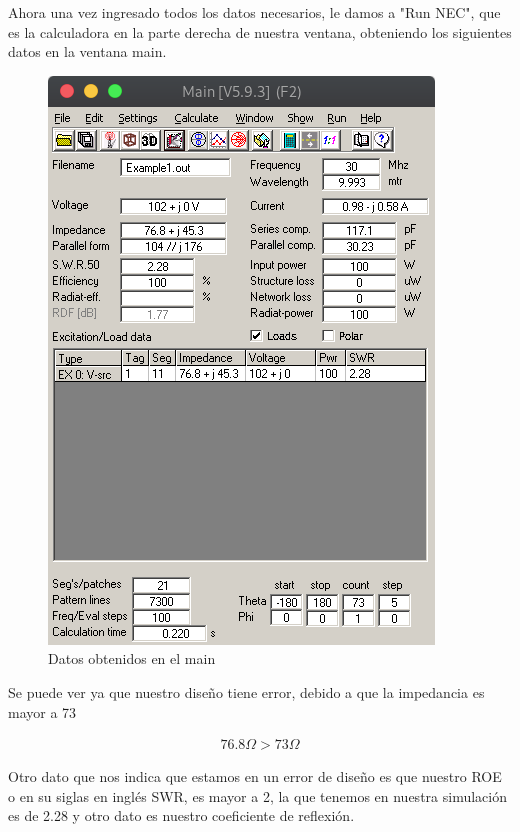 \documentclass[11pt,a4paper]{article}
\begin{document}
Ahora una vez ingresado todos los datos necesarios, le damos a "Run NEC", que es la calculadora en la parte derecha de nuestra ventana, obteniendo los siguientes datos en la ventana main.

    \begin{figure}[H]
    \centering
    \includegraphics[scale=0.4]{images/dipolo/dipolomain.png}
    \caption{Datos obtenidos en el main}
    \label{fig3:yagui2d}
    \end{figure}
    
Se puede ver ya que nuestro diseño tiene error, debido a que la impedancia es mayor a 73

\begin{align*}
    76.8\Omega > 73\Omega
\end{align*}

Otro dato que nos indica que estamos en un error de diseño es que nuestro ROE o en su siglas en ingl\'es SWR, es mayor a 2, la que tenemos en nuestra simulaci\'on es de 2.28 y otro dato es nuestro coeficiente de reflexi\'on.
\end{document}
